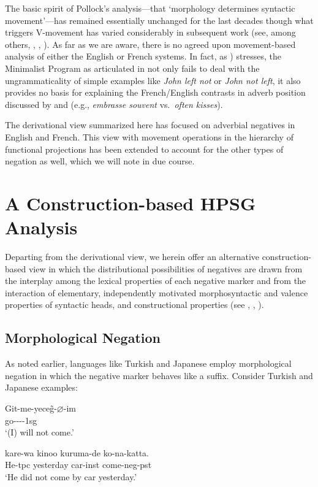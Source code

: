 \documentclass[output=paper]{langsci/langscibook}
\begin{document}
 The basic spirit of Pollock's analysis---that `morphology determines syntactic
movement'---has remained essentially unchanged for
the last decades though what triggers
 V-movement has varied considerably in
subsequent work (see, among others, \citet{Zanuttini:01}, \citet{Bo:14}, \citet{Zeijlstra:15}).
 As
far as we are aware, there is no agreed upon movement-based
analysis of either the English or French systems. In fact, as
\citet{Lasnik:00}) stresses, the Minimalist Program as
articulated in \citet{Chomsky:93,Chomsky:95,Chomsky:00} not only fails to deal with the
ungrammaticality of simple examples like {\it *John left not} or
{\it *John not left}, it also provides no basis for explaining the
French/English contrasts in adverb position discussed by \citet{Pollock:89}
and \citet{Cinque:99} (e.g., {\it embrasse souvent} vs.\ {\it often kisses}).


The derivational view summarized here has focused on adverbial negatives
in English and French. This view with movement operations in the
 hierarchy of functional projections has been extended to account for the other types of negation as well, which we will note in due course.

\section{A Construction-based HPSG Analysis}

Departing from the derivational view, we
herein offer an alternative construction-based view in which the distributional possibilities of negatives
are drawn from the interplay among the lexical properties of each negative marker
and from the interaction of elementary, independently motivated
morphosyntactic and valence properties of syntactic heads, and constructional
properties (see \citet{Kim:00}, \citet{KS:02}, \citet{Crowgey:12}).


\subsection{Morphological Negation}

As noted earlier, languages like Turkish and Japanese employ morphological negation in which the negative marker behaves like a suffix. Consider
Turkish and Japanese examples:



\begin{exe}
\ex \begin{xlist}
\ex
\gll Git-me-yece\~{g}-$\varnothing$-im \\
    go-\NEG-\FUT-\COP-{\sc 1sg} \\
    `(I) will not come.'

\ex
\gll kare-wa kinoo kuruma-de ko-na-katta. \\
He-{\sc tpc} yesterday car-{\sc inst} come-{\sc neg}-{\sc pst} \\
`He did not come by car yesterday.'

\end{xlist}\end{exe}
\end{document}
